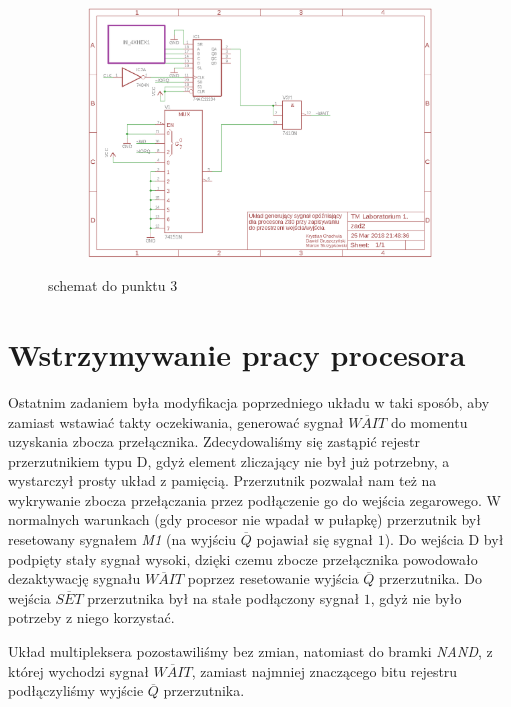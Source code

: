 \documentclass[fleqn]{article}
\begin{document}
\begin{figure}[H]
	\centering
	\begin{subfigure}[b]{0.8\textwidth}
		\includegraphics[width=\textwidth]{img/z2.png}
  \end{subfigure}
	\caption{schemat do punktu 3}
\end{figure}

\section{Wstrzymywanie pracy procesora}
Ostatnim zadaniem była modyfikacja poprzedniego układu w taki sposób, aby zamiast wstawiać takty oczekiwania, generować sygnał $\overline{WAIT}$ do momentu uzyskania zbocza przełącznika.
Zdecydowaliśmy się zastąpić rejestr przerzutnikiem typu D, gdyż element zliczający nie był już potrzebny, a wystarczył prosty układ z pamięcią. Przerzutnik pozwalał nam też na wykrywanie zbocza przełączania przez podłączenie go do wejścia zegarowego.
W normalnych warunkach (gdy procesor nie wpadał w pułapkę) przerzutnik był resetowany sygnałem \textit{M1} (na wyjściu $\overline{Q}$ pojawiał się sygnał $1$). Do wejścia D był podpięty stały sygnał wysoki, dzięki czemu zbocze przełącznika powodowało dezaktywację sygnału $\overline{WAIT}$ poprzez resetowanie wyjścia $\overline{Q}$ przerzutnika. Do wejścia $\overline{SET}$ przerzutnika był na stałe podłączony sygnał $1$, gdyż nie było potrzeby z niego korzystać.

Układ multipleksera pozostawiliśmy bez zmian, natomiast do bramki \textit{NAND}, z której wychodzi sygnał $\overline{WAIT}$, zamiast najmniej znaczącego bitu rejestru podłączyliśmy wyjście $\overline{Q}$ przerzutnika.
\end{document}
